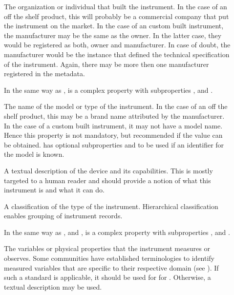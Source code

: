 \documentclass[a4paper,10pt,english]{sphinxmanual}
\begin{document}
\begin{description}
\item[{}] \leavevmode
\sphinxAtStartPar
The organization or individual that built the instrument.  In the
case of an off the shelf product, this will probably be a commercial
company that put the instrument on the market.  In the case of an
custom built instrument, the manufacturer may be the same as the
owner.  In the latter case, they would be registered as both, owner
and manufacturer.  In case of doubt, the manufacturer would be the
instance that defined the technical specification of the instrument.
Again, there may be more then one manufacturer registered in the
metadata.

\sphinxAtStartPar
In the same way as ,  is a complex property
with subproperties ,  and
.

\item[{}] \leavevmode
\sphinxAtStartPar
The name of the model or type of the instrument.  In the case of an
off the shelf product, this may be a brand name attributed by the
manufacturer.  In the case of a custom built instrument, it may not
have a model name.  Hence this property is not mandatory, but
recommended if the value can be obtained.   has optional
subproperties  and  to be used
if an identifier for the model is known.

\item[{}] \leavevmode
\sphinxAtStartPar
A textual description of the device and its capabilities.  This is
mostly targeted to a human reader and should provide a notion of
what this instrument is and what it can do.

\item[{}] \leavevmode
\sphinxAtStartPar
A classification of the type of the instrument.  Hierarchical
classification enables grouping of instrument records.

\sphinxAtStartPar
In the same way as ,  and ,
 is a complex property with subproperties
,  and
.

\item[{}] \leavevmode
\sphinxAtStartPar
The variables or physical properties that the instrument measures or
observes.  Some communities have established terminologies to
identify measured variables that are specific to their respective
domain (see {\hyperref[\detokenize{white-paper/metadata-schema-recommendations:pidinst-metadata-schema-terminologies}]{}}).  If such
a standard is applicable, it should be used for for
.  Otherwise, a textual description may be used.


\end{description}
\end{document}
